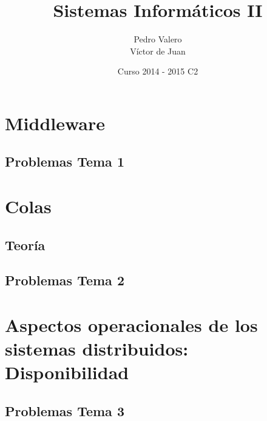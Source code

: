 \documentclass{apuntes}
\title{Sistemas Informáticos II}
\author{Pedro Valero \\ Víctor de Juan}
\date{Curso 2014 - 2015 C2}
\begin{document}
\newpage
\tableofcontents


\chapter{Middleware}


\section{Problemas Tema 1}
\newpage

\chapter{Colas}
\section{Teoría}
\section{Problemas Tema 2}



\chapter{Aspectos operacionales de los sistemas distribuidos: Disponibilidad}

\newpage
\section{Problemas Tema 3}


\printindex
\end{document}
